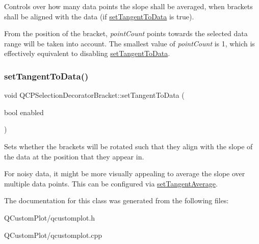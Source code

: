 Controls over how many data points the slope shall be averaged, when brackets shall be aligned with the data (if \mbox{\hyperlink{class_q_c_p_selection_decorator_bracket_a93bc6086e53a5e40a08641a7b2e2cdd5}{set\+Tangent\+To\+Data}} is true).

From the position of the bracket, {\itshape point\+Count} points towards the selected data range will be taken into account. The smallest value of {\itshape point\+Count} is 1, which is effectively equivalent to disabling \mbox{\hyperlink{class_q_c_p_selection_decorator_bracket_a93bc6086e53a5e40a08641a7b2e2cdd5}{set\+Tangent\+To\+Data}}. \mbox{\label{class_q_c_p_selection_decorator_bracket_a93bc6086e53a5e40a08641a7b2e2cdd5}} 
\subsubsection{\texorpdfstring{set\+Tangent\+To\+Data()}{setTangentToData()}}
{\footnotesize\ttfamily void Q\+C\+P\+Selection\+Decorator\+Bracket\+::set\+Tangent\+To\+Data (\begin{DoxyParamCaption}\item[{bool}]{enabled }\end{DoxyParamCaption})}

Sets whether the brackets will be rotated such that they align with the slope of the data at the position that they appear in.

For noisy data, it might be more visually appealing to average the slope over multiple data points. This can be configured via \mbox{\hyperlink{class_q_c_p_selection_decorator_bracket_adb2d0876f25a77c88042b70818f1d6e4}{set\+Tangent\+Average}}. 

The documentation for this class was generated from the following files\+:\begin{DoxyCompactItemize}
\item 
Q\+Custom\+Plot/qcustomplot.\+h\item 
Q\+Custom\+Plot/qcustomplot.\+cpp\end{DoxyCompactItemize}

